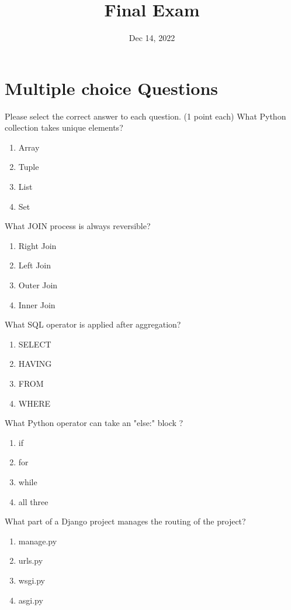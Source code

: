 \documentclass{homework}
\author{}
\title{Final Exam}
\date{Dec 14, 2022}
\begin{document}
 \maketitle
\section*{Multiple choice Questions}
Please select the correct answer to each question. (1 point each)
\question What Python collection takes unique elements?
\begin{enumerate}[label=\alph*)]
    \item Array 
    \item Tuple
    \item List
    \item Set
\end{enumerate}

\question What JOIN process is always reversible?
\begin{enumerate}[label=\alph*)]
    \item Right Join
    \item Left Join
    \item Outer Join
    \item Inner Join
\end{enumerate}

\question What SQL operator is applied after aggregation?
\begin{enumerate}[label=\alph*)]
    \item SELECT
    \item HAVING
    \item FROM
    \item WHERE
\end{enumerate}

\question What Python operator can take an "else:" block ?
\begin{enumerate}[label=\alph*)]
    \item if
    \item for
    \item while
    \item all three
\end{enumerate}

\question What part of a Django project manages the routing of the project?
\begin{enumerate}[label=\alph*)]
    \item manage.py
    \item urls.py
    \item wsgi.py
    \item asgi.py
\end{enumerate}
\end{document}
